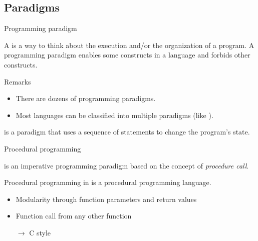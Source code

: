 \subsection{\CCLang Paradigms}

\begin{frame}{Programming paradigm}{}
  \begin{definition}
    A  is a way to think about the execution and/or the organization of a program. A programming paradigm enables some constructs in a language and forbids other constructs.
  \end{definition}

  \begin{block}{Remarks}
    \begin{itemize}
    \item
      There are dozens of programming paradigms.
    \item
      Most languages can be classified into multiple paradigms (like \CCLang).
    \end{itemize}
  \end{block}

  \begin{example}
     is a paradigm that uses a sequence of statements to change the program's state.
  \end{example}
\end{frame}

\begin{frame}{Procedural programming}{}
  \begin{definition}
     is an imperative programming paradigm based on the concept of \emph{procedure call}.
  \end{definition}
  \begin{block}{Procedural programming in \CCLang}
    \CCLang is a procedural programming language.
    \begin{itemize}
    \item
      Modularity through function parameters and return values
    \item
      Function call from any other function
    \item[$\to$]
      C style
    \end{itemize}
  \end{block}
\end{frame}

